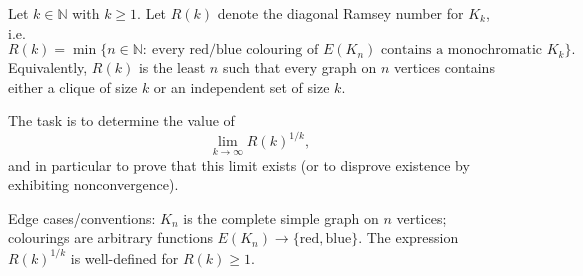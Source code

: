 Let $k\in\mathbb{N}$ with $k\ge 1$. Let $R(k)$ denote the diagonal Ramsey number for $K_k$, i.e.
\[
R(k)=\min\{n\in\mathbb{N}:\ \text{every red/blue colouring of }E(K_n)\text{ contains a monochromatic }K_k\}.
\]
Equivalently, $R(k)$ is the least $n$ such that every graph on $n$ vertices contains either a clique of size $k$ or an independent set of size $k$.

The task is to determine the value of
\[
\lim_{k\to\infty} R(k)^{1/k},
\]
and in particular to prove that this limit exists (or to disprove existence by exhibiting nonconvergence).

Edge cases/conventions: $K_n$ is the complete simple graph on $n$ vertices; colourings are arbitrary functions $E(K_n)\to\{\text{red},\text{blue}\}$. The expression $R(k)^{1/k}$ is well-defined for $R(k)\ge 1$.

